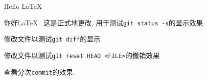 \documentclass{ctexart}
\begin{document}
    Hello \LaTeX~

    你好\LaTeX~ %
    这是正式地更改, 用于测试\verb|git status -s|的显示效果

    修改文件以测试\verb|git diff|的显示

    修改文件以测试\verb|git reset HEAD <FILE>|的撤销效果

    查看分次\verb|commit|的效果. 
\end{document}
